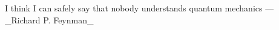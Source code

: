 \documentclass[preview]{standalone}
\begin{document}
\begin{center}
I think I can safely say that nobody understands quantum mechanics — _Richard P. Feynman_{\quad}
\end{center}
\end{document}
